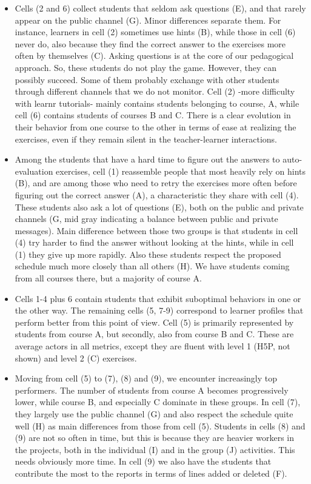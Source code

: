 \documentclass{aims}
\theoremstyle{definition}
\begin{document}
\begin{itemize}
\item
  Cells (2 and 6) collect students that seldom ask questions (E), and
  that rarely appear on the public channel (G). Minor differences
  separate them. For instance, learners in cell (2) sometimes use hints
  (B), while those in cell (6) never do, also because they find the
  correct answer to the exercises more often by themselves (C). Asking
  questions is at the core of our pedagogical approach. So, these
  students do not play the game. However, they can possibly succeed.
  Some of them probably exchange with other students through different
  channels that we do not monitor. Cell (2) -more difficulty with learnr
  tutorials- mainly contains students belonging to course, A, while cell
  (6) contains students of courses B and C. There is a clear evolution
  in their behavior from one course to the other in terms of ease at
  realizing the exercises, even if they remain silent in the
  teacher-learner interactions.
\item
  Among the students that have a hard time to figure out the answers to
  auto-evaluation exercises, cell (1) reassemble people that most
  heavily rely on hints (B), and are among those who need to retry the
  exercises more often before figuring out the correct answer (A), a
  characteristic they share with cell (4). These students also ask a lot
  of questions (E), both on the public and private channels (G, mid gray
  indicating a balance between public and private messages). Main
  difference between those two groups is that students in cell (4) try
  harder to find the answer without looking at the hints, while in cell
  (1) they give up more rapidly. Also these students respect the
  proposed schedule much more closely than all others (H). We have
  students coming from all courses there, but a majority of course A.
\item
  Cells 1-4 plus 6 contain students that exhibit suboptimal behaviors in
  one or the other way. The remaining cells (5, 7-9) correspond to
  learner profiles that perform better from this point of view. Cell (5)
  is primarily represented by students from course A, but secondly, also
  from course B and C. These are average actors in all metrics, except
  they are fluent with level 1 (H5P, not shown) and level 2 (C)
  exercises.
\item
  Moving from cell (5) to (7), (8) and (9), we encounter increasingly
  top performers. The number of students from course A becomes
  progressively lower, while course B, and especially C dominate in
  these groups. In cell (7), they largely use the public channel (G) and
  also respect the schedule quite well (H) as main differences from
  those from cell (5). Students in cells (8) and (9) are not so often in
  time, but this is because they are heavier workers in the projects,
  both in the individual (I) and in the group (J) activities. This needs
  obviously more time. In cell (9) we also have the students that
  contribute the most to the reports in terms of lines added or deleted
  (F).
\end{itemize}
\end{document}
